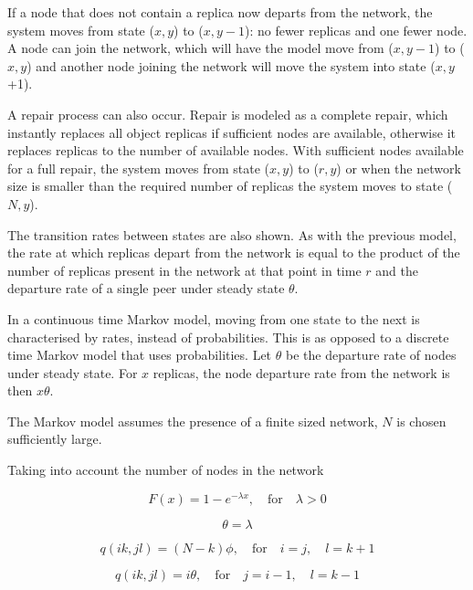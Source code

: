 \documentclass[10pt,a4paper,conference]{IEEEtran}
\begin{document}
If a node that does not contain a replica now departs from the network, the system moves from state ($x,y$) to ($x,y-1$): no fewer replicas and one fewer node. A node can join the network, which will have the model move from ($x,y-1$) to ($x,y$) and another node joining the network will move the system into state ($x,y$+1).

A repair process can also occur. Repair is modeled as a complete repair, which instantly replaces all object replicas if sufficient nodes are available, otherwise it replaces replicas to the number of available nodes. With sufficient nodes available for a full repair, the system moves from state ($x,y$) to ($r,y$) or when the network size is smaller than the required number of replicas the system moves to state ($N,y$).

The transition rates between states are also shown. As with the previous model, the rate at which replicas depart from the network is equal to the product of the number of replicas present in the network at that point in time $r$ and the departure rate of a single peer under steady state $\theta$.

In a continuous time Markov model, moving from one state to the next is characterised by rates, instead of probabilities. This is as opposed to a discrete time Markov model that uses probabilities. Let $\theta$ be the departure rate of nodes under steady state. For $x$ replicas, the node departure rate from the network is then $x\theta$.

The Markov model assumes the presence of a finite sized network, $N$ is chosen sufficiently large.

Taking into account the number of nodes in the network

\begin{equation}
    F(x) = 1 - e^{-\lambda x},\quad\textrm{for}\quad \lambda > 0
\end{equation}

\begin{equation}
    \theta = \lambda
\end{equation}

\begin{equation}
    q(i k,j l) = (N - k)\phi,\quad\textrm{for}\quad i = j,\quad l = k + 1
\end{equation}

\begin{equation}
    q(i k,j l) = i\theta,\quad\textrm{for}\quad j = i - 1,\quad l = k - 1
\end{equation}
\end{document}
